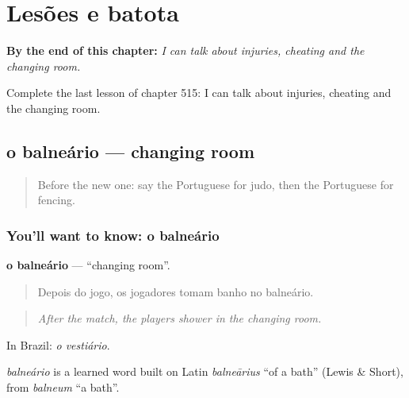 
\chapter{Lesões e batota}
\label{ch:pt-lesoes-e-batota}

\begin{chapteropening}
\textbf{By the end of this chapter:} \emph{I can talk about injuries, cheating and the changing room.}

Complete the last lesson of chapter 515: I can talk about injuries, cheating and the changing room.
\end{chapteropening}

\section[o balneário]{o balneário — changing room}

\label{lesson:PT-C515-balneario}



\begin{quote}
Before the new one: say the Portuguese for judo, then the Portuguese for fencing.
\end{quote}

\subsection*{You'll want to know: o balneário}
\textbf{o balneário} — \textquotedblleft{}changing room\textquotedblright{}.

\begin{quote}
Depois do jogo, os jogadores tomam banho no balneário.
\end{quote}

\begin{quote}
\emph{After the match, the players shower in the changing room.}
\end{quote}

In Brazil: \emph{o vestiário}.

\begin{cousinweb}
\emph{balneário} is a learned word built on Latin \emph{balneārius} \textquotedblleft{}of a bath\textquotedblright{} (Lewis \& Short), from \emph{balneum} \textquotedblleft{}a bath\textquotedblright{}.
\end{cousinweb}

